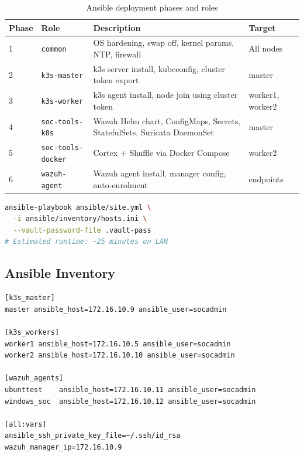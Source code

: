 \documentclass[12pt,a4paper]{report}
\begin{document}
\begin{table}[H]
\centering
\caption{Ansible deployment phases and roles}
\begin{tabularx}{\textwidth}{llXl}
\toprule
\textbf{Phase} & \textbf{Role} & \textbf{Description} & \textbf{Target} \\
\midrule
1 & \texttt{common}         & OS hardening, swap off, kernel params, NTP, firewall & All nodes \\
2 & \texttt{k3s-master}     & k3s server install, kubeconfig, cluster token export & master \\
3 & \texttt{k3s-worker}     & k3s agent install, node join using cluster token & worker1, worker2 \\
4 & \texttt{soc-tools-k8s}  & Wazuh Helm chart, ConfigMaps, Secrets, StatefulSets, Suricata DaemonSet & master \\
5 & \texttt{soc-tools-docker} & Cortex + Shuffle via Docker Compose & worker2 \\
6 & \texttt{wazuh-agent}    & Wazuh agent install, manager config, auto-enrolment & endpoints \\
\bottomrule
\end{tabularx}
\label{tab:roles}
\end{table}

\begin{lstlisting}[language=bash, caption=Full platform deployment]
ansible-playbook ansible/site.yml \
  -i ansible/inventory/hosts.ini \
  --vault-password-file .vault-pass
# Estimated runtime: ~25 minutes on LAN
\end{lstlisting}

\subsection{Ansible Inventory}

\begin{lstlisting}[caption=ansible/inventory/hosts.ini]
[k3s_master]
master ansible_host=172.16.10.9 ansible_user=socadmin

[k3s_workers]
worker1 ansible_host=172.16.10.5 ansible_user=socadmin
worker2 ansible_host=172.16.10.10 ansible_user=socadmin

[wazuh_agents]
ubunttest    ansible_host=172.16.10.11 ansible_user=socadmin
windows_soc  ansible_host=172.16.10.12 ansible_user=socadmin

[all:vars]
ansible_ssh_private_key_file=~/.ssh/id_rsa
wazuh_manager_ip=172.16.10.9
\end{lstlisting}
\end{document}
